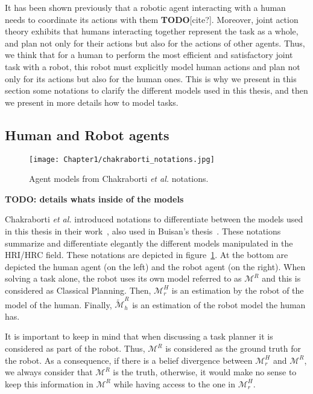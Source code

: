 It has been shown previously that a robotic agent interacting with a human needs to coordinate its actions with them \textbf{TODO}[cite?]. Moreover, joint action theory exhibits that humans interacting together represent the task as a whole, and plan not only for their actions but also for the actions of other agents. Thus, we think that for a human to perform the most efficient and satisfactory joint task with a robot, this robot must explicitly model human actions and plan not only for its actions but also for the human ones. This is why we present in this section some notations to clarify the different models used in this thesis, and then we present in more details how to model tasks.

\subsection{Human and Robot agents}

\begin{figure}
    \centering
    \texttt{[image: Chapter1/chakraborti\_notations.jpg]}
    \caption{Agent models from Chakraborti \textit{et al.} notations.}
    \label{fig:chakraborti_notations}
\end{figure}

\textbf{TODO: details whats inside of the models}

Chakraborti \textit{et al.} introduced notations to differentiate between the models used in this thesis in their work~\cite{ChakrabortiBTZS15}, also used in Buisan's thesis~\cite{thesisBuisan21}. These notations summarize and differentiate elegantly the different models manipulated in the HRI/HRC field. These notations are depicted in figure~\ref{fig:chakraborti_notations}. At the bottom are depicted the human agent (on the left) and the robot agent (on the right). When solving a task alone, the robot uses its own model referred to as $\mathcal{M}^R$ and this is considered as Classical Planning. 
Then, $\mathcal{M}^H_r$ is an estimation by the robot of the model of the human. Finally, $\tilde{\mathcal{M}}^R_h$ is an estimation of the robot model the human has. 

It is important to keep in mind that when discussing a task planner it is considered as part of the robot. Thus, $\mathcal{M}^R$ is considered as the ground truth for the robot. As a consequence, if there is a belief divergence between $\mathcal{M}^H_r$ and $\mathcal{M}^R$, we always consider that $\mathcal{M}^R$ is the truth, otherwise, it would make no sense to keep this information in $\mathcal{M}^R$ while having access to the one in $\mathcal{M}^H_r$.


